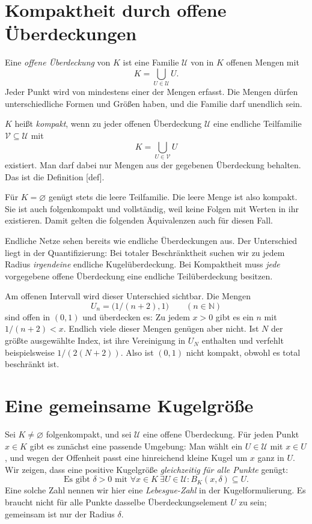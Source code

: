 \section*{Kompaktheit durch offene Überdeckungen}

Eine \emph{offene Überdeckung} von \(K\) ist eine Familie
\(\mathcal U\) von in \(K\) offenen Mengen mit
\[
 K=\bigcup_{U\in\mathcal U}U.
\]
Jeder Punkt wird von mindestens einer der Mengen erfasst.
Die Mengen dürfen unterschiedliche Formen und Größen haben,
und die Familie darf unendlich sein.

\(K\) heißt \emph{kompakt}, wenn zu jeder offenen Überdeckung
\(\mathcal U\) eine endliche Teilfamilie
\(\mathcal V\subseteq\mathcal U\) mit
\[
 K=\bigcup_{U\in\mathcal V}U
\]
existiert. Man darf dabei nur Mengen aus der gegebenen Überdeckung
behalten. Das ist die Definition
[def].

Für \(K=\varnothing\) genügt stets die leere Teilfamilie.
Die leere Menge ist also kompakt. Sie ist auch folgenkompakt
und vollständig, weil keine Folgen mit Werten in ihr existieren.
Damit gelten die folgenden Äquivalenzen auch für diesen Fall.

Endliche Netze sehen bereits wie endliche Überdeckungen aus.
Der Unterschied liegt in der Quantifizierung: Bei totaler
Beschränktheit suchen wir zu jedem Radius \emph{irgendeine}
endliche Kugelüberdeckung. Bei Kompaktheit muss \emph{jede}
vorgegebene offene Überdeckung eine endliche Teilüberdeckung
besitzen.

Am offenen Intervall wird dieser Unterschied sichtbar. Die Mengen
\[
 U_n=\bigl(1/(n+2),1\bigr)\qquad(n\in\mathbb N)
\]
sind offen in \((0,1)\) und überdecken es: Zu jedem \(x>0\)
gibt es ein \(n\) mit \(1/(n+2)<x\). Endlich viele dieser
Mengen genügen aber nicht. Ist \(N\) der größte ausgewählte
Index, ist ihre Vereinigung in \(U_N\) enthalten und verfehlt
beispielsweise \(1/(2(N+2))\). Also ist \((0,1)\) nicht
kompakt, obwohl es total beschränkt ist.

\section*{Eine gemeinsame Kugelgröße}

Sei \(K\ne\varnothing\) folgenkompakt, und sei
\(\mathcal U\) eine offene Überdeckung. Für jeden Punkt
\(x\in K\) gibt es zunächst eine passende Umgebung: Man wählt
ein \(U\in\mathcal U\) mit \(x\in U\), und wegen der
Offenheit passt eine hinreichend kleine Kugel um \(x\) ganz in
\(U\). Wir zeigen, dass eine positive Kugelgröße
\emph{gleichzeitig für alle Punkte} genügt:
\[
 \text{Es gibt }\delta>0\text{ mit }
 \forall x\in K\ \exists U\in\mathcal U:
                  B_K(x,\delta)\subseteq U.
\]
Eine solche Zahl nennen wir hier eine \emph{Lebesgue-Zahl}
in der Kugelformulierung. Es braucht nicht für alle Punkte
dasselbe Überdeckungselement \(U\) zu sein; gemeinsam ist nur
der Radius \(\delta\).

